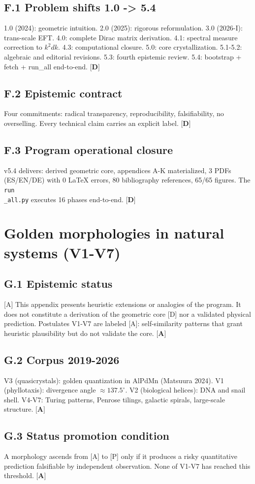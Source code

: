 ﻿\documentclass[11pt,letterpaper]{article}
\begin{document}
\subsection{F.1 Problem shifts 1.0 -> 5.4}
1.0 (2024): geometric intuition. 2.0 (2025): rigorous reformulation. 3.0 (2026-I): trans-scale EFT. 4.0: complete Dirac matrix derivation. 4.1: spectral measure correction to $k^2 dk$. 4.3: computational closure. 5.0: core crystallization. 5.1-5.2: algebraic and editorial revisions. 5.3: fourth epistemic review. 5.4: bootstrap + fetch + run\_all end-to-end. $\textbf{[D]}$
\subsection{F.2 Epistemic contract}
Four commitments: radical transparency, reproducibility, falsifiability, no overselling. Every technical claim carries an explicit label. $\textbf{[D]}$
\subsection{F.3 Program operational closure}
v5.4 delivers: derived geometric core, appendices A-K materialized, 3 PDFs (ES/EN/DE) with 0 LaTeX errors, 80 bibliography references, 65/65 figures. The \texttt{run\\\_all.py} executes 16 phases end-to-end. $\textbf{[D]}$
\section{Golden morphologies in natural systems (V1-V7)}
\subsection{G.1 Epistemic status}
[A] This appendix presents heuristic extensions or analogies of the program. It does not constitute a derivation of the geometric core [D] nor a validated physical prediction. Postulates V1-V7 are labeled [A]: self-similarity patterns that grant heuristic plausibility but do not validate the core. $\textbf{[A]}$
\subsection{G.2 Corpus 2019-2026}
V3 (quasicrystals): golden quantization in AlPdMn (Matsuura 2024). V1 (phyllotaxis): divergence angle $\approx 137{.}5^\circ$. V2 (biological helices): DNA and snail shell. V4-V7: Turing patterns, Penrose tilings, galactic spirals, large-scale structure. $\textbf{[A]}$
\subsection{G.3 Status promotion condition}
A morphology ascends from [A] to [P] only if it produces a risky quantitative prediction falsifiable by independent observation. None of V1-V7 has reached this threshold. $\textbf{[A]}$
\end{document}
